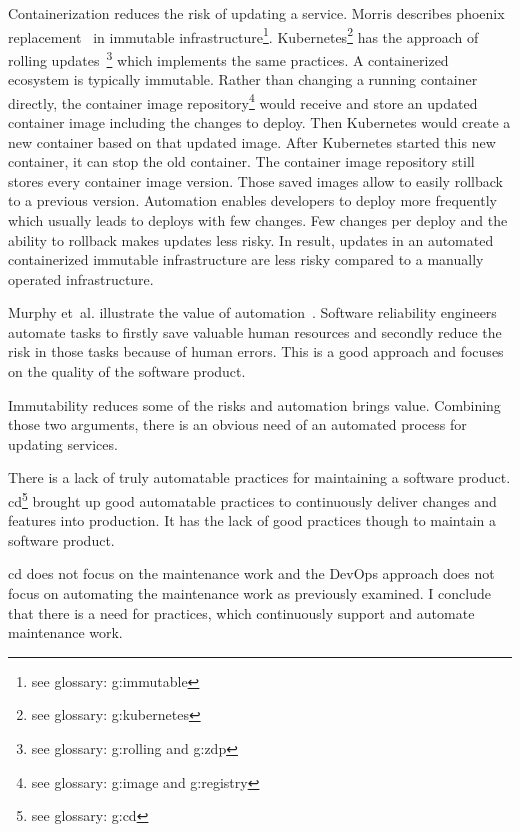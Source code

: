 Containerization reduces the risk of updating a service. Morris describes phoenix
replacement~\cite{infra_as_code_phoenix} in immutable infrastructure\footnote{see
  glossary: \gls{g:immutable}}. Kubernetes\footnote{see glossary: \gls{g:kubernetes}} has
the approach of rolling updates~\footnote{see glossary: \gls{g:rolling} and \gls{g:zdp}}
which implements the same practices. A containerized ecosystem is typically
immutable. Rather than changing a running container directly, the container image
repository\footnote{see glossary: \gls{g:image} and \gls{g:registry}} would receive and
store an updated container image including the changes to deploy. Then Kubernetes would
create a new container based on that updated image. After Kubernetes started this new
container, it can stop the old container. The container image repository still stores
every container image version. Those saved images allow to easily rollback to a previous
version. Automation enables developers to deploy more frequently which usually leads to
deploys with few changes. Few changes per deploy and the ability to rollback makes updates
less risky. In result, updates in an automated containerized immutable infrastructure are
less risky compared to a manually operated infrastructure.

Murphy et~al. illustrate the value of automation~\cite{sre_automation}. Software
reliability engineers automate tasks to firstly save valuable human resources and secondly
reduce the risk in those tasks because of human errors. This is a good approach and
focuses on the quality of the software product.

Immutability reduces some of the risks and automation brings value. Combining those two
arguments, there is an obvious need of an automated process for updating services.

There is a lack of truly automatable practices for maintaining a software
product. \gls{cd}\footnote{see glossary: \gls{g:cd}} brought up good automatable practices
to continuously deliver changes and features into production. It has the lack of good
practices though to maintain a software product.

\gls{cd} does not focus on the maintenance work and the DevOps approach does not focus on
automating the maintenance work as previously examined. I conclude that there is a need
for practices, which continuously support and automate maintenance work.

